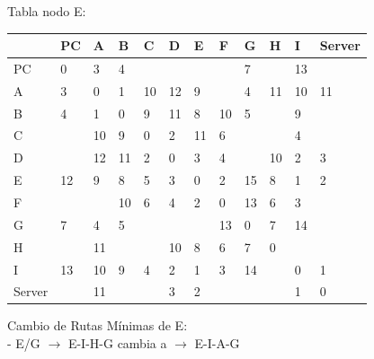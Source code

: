 \documentclass[a4paper]{article}
\begin{document}
\begin{table}[h]
Tabla nodo E:\\
\begin{tabular}{|l|l|l|l|l|l|l|l|l|l|l|l|}
\hline
       & PC & A  & B  & C  & D  & E  & F  & G  & H  & I  & Server \\ \hline
PC     & 0  & 3  & 4  &    &    &    &    & 7  &    & 13 &        \\ \hline
A      & 3  & 0  & 1  & 10 & 12 & 9  &    & 4  & 11 & 10 & 11     \\ \hline
B      & 4  & 1  & 0  & 9  & 11 & 8  & 10 & 5  &    & 9  &        \\ \hline
C      &    & 10 & 9  & 0  & 2  & 11 & 6  &    &    & 4  &        \\ \hline
D      &    & 12 & 11 & 2  & 0  & 3  & 4  &    & 10 & 2  & 3      \\ \hline
E      & 12 & 9  & 8  & 5  & 3  & 0  & 2  & 15 & 8  & 1  & 2      \\ \hline
F      &    &    & 10 & 6  & 4  & 2  & 0  & 13 & 6  & 3  &        \\ \hline
G      & 7  & 4  & 5  &    &    &    & 13 & 0  & 7  & 14 &        \\ \hline
H      &    & 11 &    &    & 10 & 8  & 6  & 7  & 0  &    &        \\ \hline
I      & 13 & 10 & 9  & 4  & 2  & 1  & 3  & 14 &    & 0  & 1      \\ \hline
Server &    & 11 &    &    & 3  & 2  &    &    &    & 1  & 0      \\ \hline
\end{tabular}

Cambio de Rutas Mínimas de E:\\
-	E/G  $\rightarrow$  E-I-H-G  cambia a  $\rightarrow$  E-I-A-G\\

\end{table}
\clearpage
\end{document}
